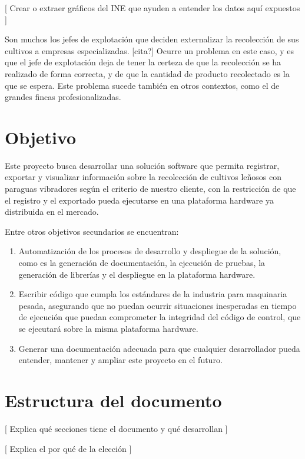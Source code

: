 [ Crear o extraer gráficos del INE que ayuden a entender los datos aquí expuestos ]

Son muchos los jefes de explotación que deciden externalizar la recolección
de sus cultivos a empresas especializadas. [cita?] Ocurre un problema en este
caso, y es que el jefe de explotación deja de tener la certeza de que la
recolección se ha realizado de forma correcta, y de que la cantidad de producto
recolectado es la que se espera. Este problema sucede también en otros
contextos, como el de grandes fincas profesionalizadas.


\section{Objetivo}

Este proyecto busca desarrollar una solución software que permita
registrar, exportar y visualizar información sobre la recolección de cultivos
leñosos con paraguas vibradores según el criterio de nuestro cliente,
con la restricción de que el registro y el exportado pueda ejecutarse en
una plataforma hardware ya distribuida en el mercado.

Entre otros objetivos secundarios se encuentran:

\begin{enumerate}
    \item Automatización de los procesos de desarrollo y despliegue de la solución, como es
    la generación de documentación, la ejecución de pruebas, la generación de librerías
    y el despliegue en la plataforma hardware.
    \item Escribir código que cumpla los estándares de la industria para maquinaria pesada,
    asegurando que no puedan ocurrir situaciones inesperadas en tiempo de ejecución que puedan
    comprometer la integridad del código de control, que se ejecutará sobre la misma plataforma
    hardware.
    \item Generar una documentación adecuada para que cualquier desarrollador pueda entender,
    mantener y ampliar este proyecto en el futuro.
\end{enumerate}

\section{Estructura del documento}

[ Explica qué secciones tiene el documento y qué desarrollan ]

[ Explica el por qué de la elección ]
